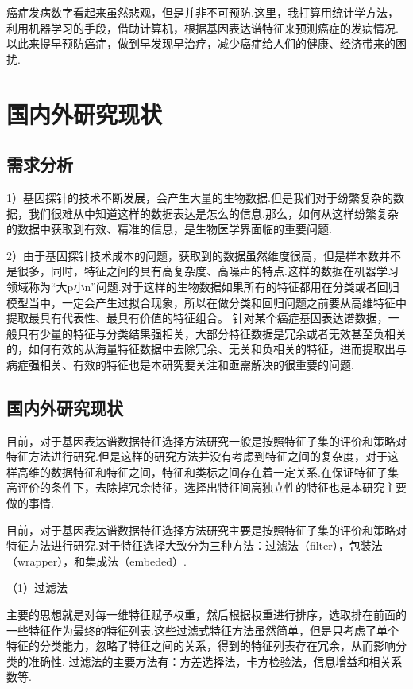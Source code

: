 \documentclass{njubachelor}
\begin{document}
癌症发病数字看起来虽然悲观，但是并非不可预防.这里，我打算用统计学方法，利用机器学习的手段，借助计算机，根据基因表达谱特征来预测癌症的发病情况.以此来提早预防癌症，做到早发现早治疗，减少癌症给人们的健康、经济带来的困扰.

\section{国内外研究现状}

\subsection{需求分析}

1）基因探针的技术不断发展，会产生大量的生物数据.但是我们对于纷繁复杂的数据，我们很难从中知道这样的数据表达是怎么的信息.那么，如何从这样纷繁复杂的数据中获取到有效、精准的信息，是生物医学界面临的重要问题.

2）由于基因探针技术成本的问题，获取到的数据虽然维度很高，但是样本数并不是很多，同时，特征之间的具有高复杂度、高噪声的特点.这样的数据在机器学习领域称为“大p小n”问题.对于这样的生物数据如果所有的特征都用在分类或者回归模型当中，一定会产生过拟合现象，所以在做分类和回归问题之前要从高维特征中提取最具有代表性、最具有价值的特征组合。 针对某个癌症基因表达谱数据，一般只有少量的特征与分类结果强相关，大部分特征数据是冗余或者无效甚至负相关的，如何有效的从海量特征数据中去除冗余、无关和负相关的特征，进而提取出与病症强相关、有效的特征也是本研究要关注和亟需解决的很重要的问题.

\subsection{国内外研究现状}
目前，对于基因表达谱数据特征选择方法研究一般是按照特征子集的评价和策略对特征方法进行研究.但是这样的研究方法并没有考虑到特征之间的复杂度，对于这样高维的数据特征和特征之间，特征和类标之间存在着一定关系.在保证特征子集高评价的条件下，去除掉冗余特征，选择出特征间高独立性的特征也是本研究主要做的事情.

目前，对于基因表达谱数据特征选择方法研究主要是按照特征子集的评价和策略对特征方法进行研究.对于特征选择大致分为三种方法：过滤法（filter），包装法（wrapper），和集成法（embeded）.

    （1）过滤法

主要的思想就是对每一维特征赋予权重，然后根据权重进行排序，选取排在前面的一些特征作为最终的特征列表.这些过滤式特征方法虽然简单，但是只考虑了单个特征的分类能力，忽略了特征之间的关系，得到的特征列表存在冗余，从而影响分类的准确性. 过滤法的主要方法有：方差选择法，卡方检验法，信息增益和相关系数等.
\end{document}
